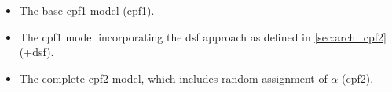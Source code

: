 \begin{frame}[t]
\begin{itemize}
\item The base \gls{cpf1} model (\gls{cpf1}).
\item The \gls{cpf1} model incorporating the \gls{dsf} approach as defined in \cref{sec:arch_cpf2} (+\gls{dsf}).
\item The complete \gls{cpf2} model, which includes random assignment of $\alpha$ (\gls{cpf2}).
\end{itemize}
\end{frame}

